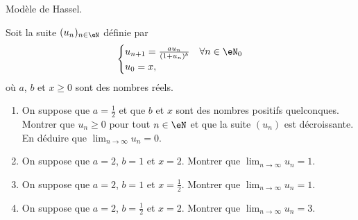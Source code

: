 
\begin{exercice}\label{exoTD3-0009}

	Modèle de Hassel.

	Soit la suite $(u_n)_{n\in\eN}$ définie par
	\begin{equation}
		\begin{cases}
			u_{n+1}=\frac{ au_n }{ (1+u_n)^b }	&	\text{$\forall n\in\eN_0$}\\
			u_0=x,
		\end{cases}
	\end{equation}
	où $a$, $b$ et $x\geq 0$ sont des nombres réels.
	\begin{enumerate}
		\item
			On suppose que $a=\frac{ 1 }{2}$ et que $b$ et $x$ sont des nombres positifs quelconques. Montrer que $u_n\geq 0$ pour tout $n\in\eN$ et que la suite $(u_n)$ est décroissante. En déduire que $\lim_{n\to\infty}u_n=0$.
		\item
			On suppose que $a=2$, $b=1$ et $x=2$. Montrer que $\lim_{n\to\infty}u_n=1$.
		\item
			On suppose que $a=2$, $b=1$ et $x=\frac{ 1 }{2}$. Montrer que $\lim_{n\to\infty}u_n=1$.
		\item
			On suppose que $a=2$, $b=\frac{ 1 }{2}$ et $x=2$. Montrer que $\lim_{n\to\infty}u_n=3$.
	\end{enumerate}

\end{exercice}
